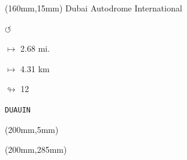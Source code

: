 \begin{textblock*}{40mm}(160mm,15mm)%
Dubai Autodrome International
\par \Huge$\circlearrowleft$
\Large
\par$\mapsto$ 2.68 mi.
\par$\mapsto$ 4.31 km
\par$\looparrowright$ 12
\par\hfill\tiny\tt DUAUIN\\
\end{textblock*}
\begin{textblock*}{20mm}(200mm,5mm)%
\fbox{\thepage}
\end{textblock*}
\begin{textblock*}{20mm}(200mm,285mm)%
\fbox{\thepage}
\end{textblock*}
\null\newpage


